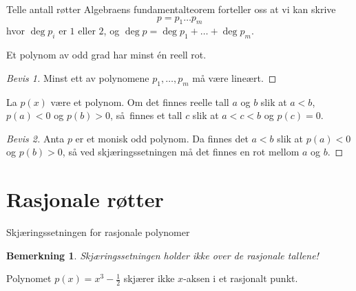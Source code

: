 \documentclass[norsk, handout]{beamer}
\theoremstyle{example}
\newtheorem{remark}{Bemerkning}
\begin{document}
\begin{frame}{Telle antall røtter}
    Algebraens fundamentalteorem forteller oss at vi kan skrive
    \[
        p = p_1\dots p_m
    \]
    hvor $\deg p_i$ er $1$ eller $2$,
    og $\deg p = \deg p_1 + \dots + \deg p_m$.

    \pause
    \begin{corollary}
        Et polynom av odd grad har minst \'en reell rot.
    \end{corollary}
    \begin{proof}[Bevis 1]
        Minst ett av polynomene $p_1,\dots,p_m$ må være lineært.
    \end{proof}
\end{frame}

\begin{frame}
    \begin{lemma}[Skjæringssetningen]
        La $p(x)$ være et polynom.
        Om det finnes reelle tall $a$ og $b$ slik
        at $a < b$, $p(a) < 0$ og $p(b) > 0$,
        så finnes et tall $c$ slik at
        $a < c < b$ og $p(c) = 0$.
    \end{lemma}
    \begin{proof}[Bevis 2]
        Anta $p$ er et monisk odd polynom.
        Da finnes det $a < b$ slik at $p(a) < 0$ og $p(b) > 0$,
        så ved skjæringssetningen må det finnes en rot mellom $a$ og $b$.
    \end{proof}
\end{frame}

\section{Rasjonale røtter}

\begin{frame}{Skjæringssetningen for rasjonale polynomer}
    \begin{remark}
        Skjæringssetningen holder ikke over de rasjonale tallene!
    \end{remark}
    \begin{example}
        Polynomet $p(x) = x^3 - \frac 1 2$ skjærer ikke $x$-aksen i et rasjonalt punkt.
        \begin{figure}
            \centering
        \end{figure}
    \end{example}
\end{frame}
\end{document}
